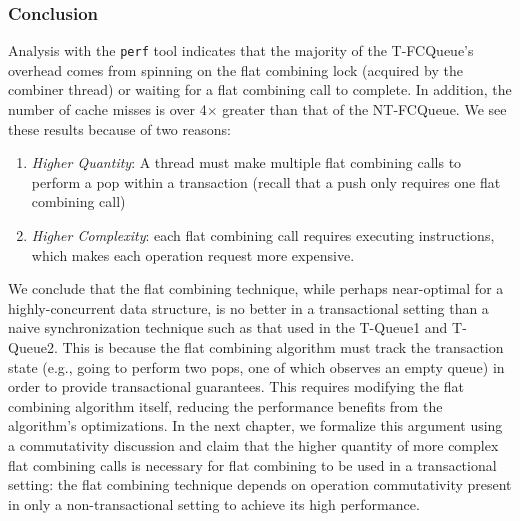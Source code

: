 \subsubsection{Conclusion}
Analysis with the \texttt{perf} tool indicates that the majority of the T-FCQueue's overhead comes from spinning on the flat combining lock (acquired by the combiner thread) or waiting for a flat combining call to complete. In addition, the number of cache misses is over 4$\times$ greater than that of the NT-FCQueue. We see these results because of two reasons:
\begin{enumerate}
\item \emph{Higher Quantity}: A thread must make multiple flat combining calls to perform a pop within a transaction (recall that a push only requires one flat combining call) 
\item \emph{Higher Complexity}: each flat combining call requires executing instructions, which makes each operation request more expensive.
\end{enumerate}

We conclude that the flat combining technique, while perhaps near-optimal for a highly-concurrent data structure, is no better in a transactional setting than a naive synchronization technique such as that used in the T-Queue1 and T-Queue2. This is because the flat combining algorithm must track the transaction state (e.g., going to perform two pops, one of which observes an empty queue) in order to provide transactional guarantees. This requires modifying the flat combining algorithm itself, reducing the performance benefits from the algorithm's optimizations. In the next chapter, we formalize this argument using a commutativity discussion and claim that the higher quantity of more complex flat combining calls is necessary for flat combining to be used in a transactional setting: the flat combining technique depends on operation commutativity present in only a non-transactional setting to achieve its high performance. 
